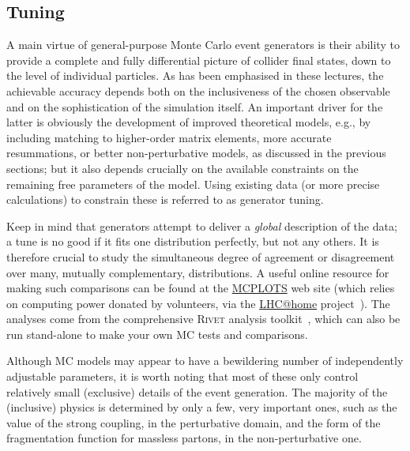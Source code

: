 \subsection{Tuning \label{sec:tuning}} 
%
%
%
%

A main virtue of general-purpose Monte Carlo event generators
is their ability to
provide a complete and fully differential picture of collider final
states, down to the level of individual particles. 
As has been emphasised in these lectures, 
the achievable accuracy depends both on the
inclusiveness of the chosen observable and on the  
sophistication of the simulation itself. An important driver for the
latter is obviously the development of improved theoretical models,
e.g., by including matching to higher-order matrix elements, more
accurate resummations, or better non-perturbative models,  as
discussed in the previous sections; but it  
also depends crucially on the available constraints on the remaining
free parameters of the model. Using existing data (or more precise
calculations) to constrain these is referred to as generator
tuning. 

Keep in mind that generators attempt to deliver a \emph{global}
description of the data; a tune is no good if it fits one distribution
perfectly, but not any others. It is therefore crucial to study the
simultaneous degree of agreement or disagreement over many, mutually
complementary, distributions. 
A useful online resource for making such comparisons can be found at
the \href{http://mcplots.cern.ch}{MCPLOTS} web
site\cite{Karneyeu:2013aha} (which relies on computing power donated
by volunteers,
via the \href{http://lhcathome.web.cern.ch/test4theory}{LHC@home} project~\cite{Lombra?aGonz?lez:2012zz}). The
analyses come from the comprehensive \textsc{Rivet} analysis
toolkit~\cite{Buckley:2010ar}, which can also be run stand-alone to
make your own MC tests and comparisons.

%
Although MC models may appear to have a
bewildering number of independently adjustable parameters, 
it is worth noting that most  of these only control
relatively small (exclusive) details of the event generation. The
majority of the 
(inclusive) physics is determined by only a few, very important ones, 
such as the value of the strong coupling, in the perturbative
domain, and the form of the fragmentation function for massless
partons, in the non-perturbative one. 

